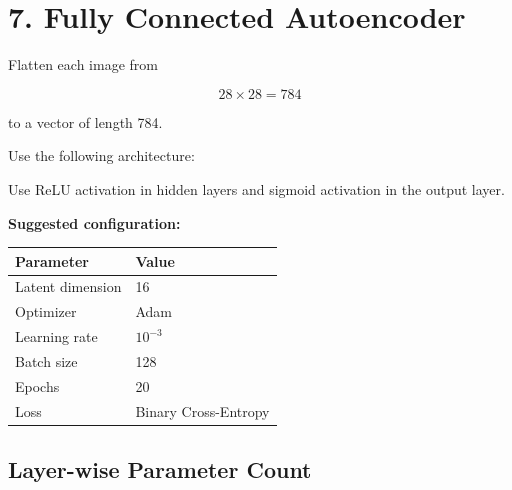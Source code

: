 \documentclass[10pt]{article}
\begin{document}
\section*{7. Fully Connected Autoencoder}

Flatten each image from

\[
28\times28=784
\]

to a vector of length 784.

Use the following architecture:

\begin{center}
\end{center}

Use ReLU activation in hidden layers and sigmoid activation in the output
layer.

\textbf{Suggested configuration:}

\begin{center}
\begin{tabular}{|l|l|}
\hline
Parameter & Value\\
\hline
Latent dimension & 16\\
Optimizer & Adam\\
Learning rate & $10^{-3}$\\
Batch size & 128\\
Epochs & 20\\
Loss & Binary Cross-Entropy\\
\hline
\end{tabular}
\end{center}

\subsection*{Layer-wise Parameter Count}
\end{document}
